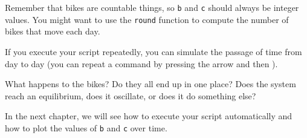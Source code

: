 Remember that bikes are countable things, so \lstinline{b} and \lstinline{c} should always be integer values.  You might want to use the \lstinline{round} function
to compute the number of bikes that move each day.

If you execute your script repeatedly, you can simulate the passage
of time from day to day (you can repeat a command by pressing the  arrow and then ).

What happens to the bikes?  Do they all end up in one place?  Does the system reach an equilibrium, does it oscillate, or does it do something else?

In the next chapter, we will see how to execute your script automatically
and how to plot the values of \lstinline{b} and \lstinline{c} over time.


